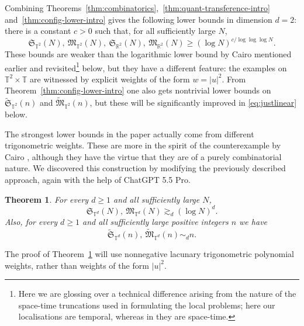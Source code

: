 \documentclass[10pt,a4paper]{amsart}
\newtheorem{theorem}{Theorem}[section]
\numberwithin{equation}{section}
\renewcommand{\ge}{\geqslant}
\begin{document}
Combining Theorems~\ref{thm:combinatorics},~\ref{thm:quant-transference-intro} and~\ref{thm:config-lower-intro} gives the following lower bounds in dimension $d=2$: there is a constant $c>0$ such that, for all sufficiently large $N$,
\begin{equation}\label{eq:logtologloglog}
\mathfrak{S}_{\mathbb{T}^2}(N),\ \mathfrak{M}_{\mathbb{T}^2}(N),\ \mathfrak{S}_{\mathbb{R}^2}(N),\ \mathfrak{M}_{\mathbb{R}^2}(N) \ge (\log N)^{c/\log\log\log N}.
\end{equation}
These bounds are weaker than the logarithmic lower bound by Cairo mentioned earlier and revisited\footnote{Here we are glossing over a technical difference arising from the nature of the space-time truncations used in formulating the local problems; here our localisations are temporal, whereas in \cite{Cairo} they are space-time.} below, but they have a different feature: the examples on $\mathbb{T}^2\times\mathbb{T}$ are witnessed by explicit weights of the form $w=|u|^2$.
From Theorem~\ref{thm:config-lower-intro} one also gets nontrivial lower bounds on $\widetilde{\mathfrak{S}}_{\mathbb{T}^2}(n)$ and $\widetilde{\mathfrak{M}}_{\mathbb{T}^2}(n)$, but these will be significantly improved in \eqref{eq:justlinear} below.

The strongest lower bounds in the paper actually come from different trigonometric weights.
These are more in the spirit of the counterexample by Cairo \cite{Cairo}, although they have the virtue that they are of a purely combinatorial nature.
We discovered this construction by modifying the previously described approach, again with the help of ChatGPT 5.5 Pro.


\begin{theorem}\label{thm:d1-log-intro}
For every $d\ge1$ and all sufficiently large $N$,
\begin{equation}\label{eq:justlog1}
\mathfrak{S}_{\mathbb{T}^d}(N),\ \mathfrak{M}_{\mathbb{T}^d}(N)\gtrsim_d (\log N)^d.
\end{equation}
Also, for every $d\ge1$ and all sufficiently large positive integers $n$ we have
\begin{equation}\label{eq:justlinear}
\widetilde{\mathfrak{S}}_{\mathbb{T}^d}(n),\ \widetilde{\mathfrak{M}}_{\mathbb{T}^d}(n)\sim_d n.
\end{equation}
\end{theorem}


The proof of Theorem~\ref{thm:d1-log-intro} will use nonnegative lacunary trigonometric polynomial weights, rather than weights of the form $|u|^2$. 
\end{document}
